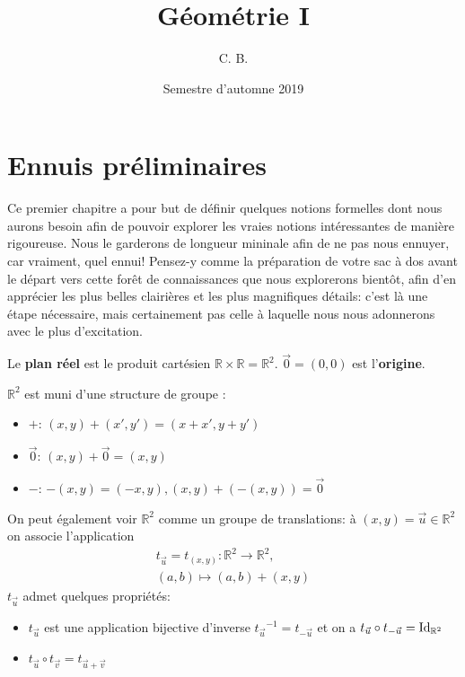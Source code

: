 \documentclass{book}
\title{Géométrie I}
\author{C. B.}
\date{Semestre d'automne 2019}
\numberwithin{equation}{section}
\providecommand{\plan}{{\mathbb R^2}}
\providecommand{\origin}{{\vec 0}}
\providecommand{\id}{{\textnormal{Id}}}
\providecommand{\idR}{{\id_\plan}}
\providecommand{\trans}[1]{{t_{#1}}}
\begin{document}
\maketitle

\chapter*{Ennuis préliminaires}

Ce premier chapitre a pour but de définir quelques notions formelles dont nous aurons besoin afin de pouvoir explorer les vraies notions intéressantes de manière rigoureuse. Nous le garderons de longueur mininale afin de ne pas nous ennuyer, car vraiment, quel ennui! Pensez-y comme la préparation de votre sac à dos avant le départ vers cette forêt de connaissances que nous explorerons bientôt, afin d'en apprécier les plus belles clairières et les plus magnifiques détails: c'est là une étape nécessaire, mais certainement pas celle à laquelle nous nous adonnerons avec le plus d'excitation.

\begin{defn}
	Le \textbf{plan réel} est le produit cartésien $\mathbb R \times \mathbb R = \plan$. $\origin = (0, 0)$ est l'\textbf{origine}.\par
	$\plan$ est muni d'une structure de groupe :
	\begin{itemize}
		\item $+$: $(x, y) + (x', y') = (x+x', y+y')$
		\item $\origin$: $(x, y) + \origin = (x, y)$
		\item $-$: $-(x, y) = (-x, y), (x, y) + (-(x, y)) = \origin$
	\end{itemize}
	On peut également voir $\plan$ comme un groupe de translations: à $(x, y) = \vec u \in \plan$ on associe l'application
	\begin{align*}
		\trans{\vec u} = \trans{(x, y)} : \plan \to \plan,\\ (a, b) \mapsto (a, b) + (x, y)
	\end{align*}
	$\trans{\vec u}$ admet quelques propriétés:
	\begin{itemize}
		\item $\trans{\vec u}$ est une application bijective d'inverse $\trans{\vec u}^{-1} = \trans{-\vec u}$ et on a $\trans{\vec u} \circ \trans{-\vec u} = \idR$
		\item $\trans{\vec u} \circ \trans{\vec v} = \trans{\vec u + \vec v}$
	\end{itemize}
\end{defn}
\end{document}
